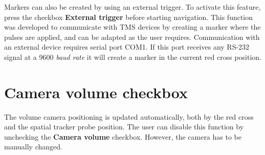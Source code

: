 Markers can also be created by using an external trigger. To activate this feature, press the checkbox \textbf{External trigger} before starting navigation. This function was developed to communicate with TMS devices by creating a marker where the pulses are applied, and can be adapted as the user requires. Communication with an external device requires serial port COM1. If this port receives any RS-232 signal at a 9600 \textit{baud rate} it will create a marker in the current red cross position.

\section{Camera volume checkbox}

The volume camera positioning is updated automatically, both by the red cross and the spatial tracker probe position. The user can disable this function by unchecking the \textbf{Camera volume} checkbox. However, the camera has to be manually changed.
